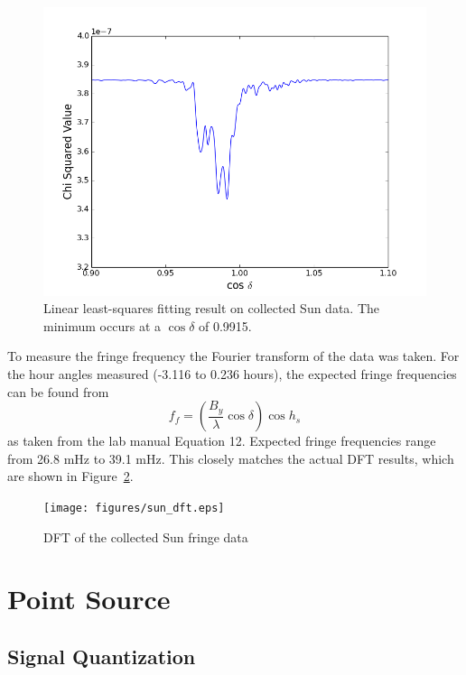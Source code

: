 \documentclass[12pt]{article}
\begin{document}
\begin{figure}
\centering
\includegraphics[width=\linewidth]{figures/sun_fit.png}
\caption{Linear least-squares fitting result on collected Sun data. The minimum occurs at a $\cos \delta$ of 0.9915.}
\label{fig:sunfit}
\end{figure}

To measure the fringe frequency the Fourier transform of the data was taken.
For the hour angles measured (-3.116 to 0.236 hours), the expected fringe frequencies can be found from
\begin{equation}
f_f = \left( \frac{B_y}{\lambda} \cos \delta \right) \cos h_s
\end{equation}
as taken from the lab manual Equation 12.
Expected fringe frequencies range from 26.8 mHz to 39.1 mHz.
This closely matches the actual DFT results, which are shown in Figure~\ref{fig:sundft}.

\begin{figure}
\centering
\texttt{[image: figures/sun\_dft.eps]}
\caption{DFT of the collected Sun fringe data}
\label{fig:sundft}
\end{figure}


\section{Point Source}

\subsection{Signal Quantization}
\end{document}
